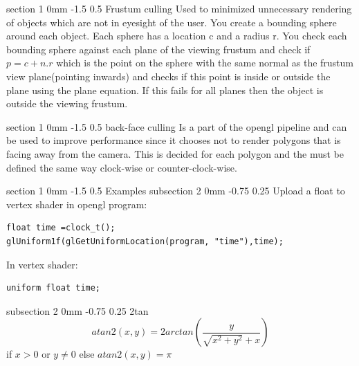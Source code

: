 \documentclass[a4paper,11pt]{article}
\makeatletter
\renewcommand{\section}{\@startsection
   {section}%
   {1}%
   {0mm}%
   {-1.5\baselineskip}%
   {0.5\baselineskip}%
   {\sffamily\bfseries\upshape\normalsize}}%
\renewcommand{\subsection}{\@startsection
   {subsection}%
   {2}%
   {0mm}%
   {-0.75\baselineskip}%
   {0.25\baselineskip}%
   {\rmfamily\normalfont\slshape\normalsize}}%
\makeatother
\begin{document}
\section{Frustum culling}
Used to minimized unnecessary rendering of objects which are not in eyesight of the user. You create a bounding sphere around each object. Each sphere has a location c and a radius r. You check each bounding sphere against each plane of the viewing frustum and check if $p=c+n.r$ which is the point on the sphere with the same normal as the frustum view plane(pointing inwards) and checks if this point is inside or outside the plane using the plane equation. If this fails for all planes then the object is outside the viewing frustum.

\section{back-face culling}
Is a part of the opengl pipeline and can be used to improve performance since it chooses not to render polygons that is facing away from the camera. This is decided for each polygon and the must be defined the same way clock-wise or counter-clock-wise. 

\section{Examples}
\subsection{Upload a float to vertex shader}
in opengl program:
\begin{lstlisting}
float time =clock_t();
glUniform1f(glGetUniformLocation(program, "time"),time);
\end{lstlisting}
In vertex shader:
\begin{lstlisting}
uniform float time;
\end{lstlisting}

\subsection{2tan}
$$atan2(x,y)=2arctan(\dfrac{y}{\sqrt{x^2+y^2}+x})$$ if $x>0 $ or $ y\neq0$ else $atan2(x,y)=\pi$
\end{document}
